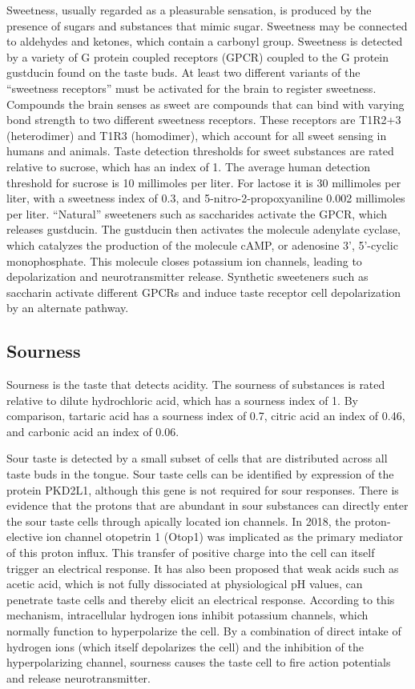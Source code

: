 \documentclass[]{book}
\begin{document}
Sweetness, usually regarded as a pleasurable sensation, is produced by the presence of sugars and substances that mimic sugar. Sweetness may be connected to aldehydes and ketones, which contain a carbonyl group. Sweetness is detected by a variety of G protein coupled receptors (GPCR) coupled to the G protein gustducin found on the taste buds. At least two different variants of the ``sweetness receptors'' must be activated for the brain to register sweetness. Compounds the brain senses as sweet are compounds that can bind with varying bond strength to two different sweetness receptors. These receptors are T1R2+3 (heterodimer) and T1R3 (homodimer), which account for all sweet sensing in humans and animals. Taste detection thresholds for sweet substances are rated relative to sucrose, which has an index of 1. The average human detection threshold for sucrose is 10 millimoles per liter. For lactose it is 30 millimoles per liter, with a sweetness index of 0.3, and 5-nitro-2-propoxyaniline 0.002 millimoles per liter. ``Natural'' sweeteners such as saccharides activate the GPCR, which releases gustducin. The gustducin then activates the molecule adenylate cyclase, which catalyzes the production of the molecule cAMP, or adenosine 3', 5'-cyclic monophosphate. This molecule closes potassium ion channels, leading to depolarization and neurotransmitter release. Synthetic sweeteners such as saccharin activate different GPCRs and induce taste receptor cell depolarization by an alternate pathway.

\hypertarget{sourness}{%
\subsection{Sourness}\label{sourness}}

Sourness is the taste that detects acidity. The sourness of substances is rated relative to dilute hydrochloric acid, which has a sourness index of 1. By comparison, tartaric acid has a sourness index of 0.7, citric acid an index of 0.46, and carbonic acid an index of 0.06.

Sour taste is detected by a small subset of cells that are distributed across all taste buds in the tongue. Sour taste cells can be identified by expression of the protein PKD2L1, although this gene is not required for sour responses. There is evidence that the protons that are abundant in sour substances can directly enter the sour taste cells through apically located ion channels. In 2018, the proton-elective ion channel otopetrin 1 (Otop1) was implicated as the primary mediator of this proton influx. This transfer of positive charge into the cell can itself trigger an electrical response. It has also been proposed that weak acids such as acetic acid, which is not fully dissociated at physiological pH values, can penetrate taste cells and thereby elicit an electrical response. According to this mechanism, intracellular hydrogen ions inhibit potassium channels, which normally function to hyperpolarize the cell. By a combination of direct intake of hydrogen ions (which itself depolarizes the cell) and the inhibition of the hyperpolarizing channel, sourness causes the taste cell to fire action potentials and release neurotransmitter.
\end{document}
